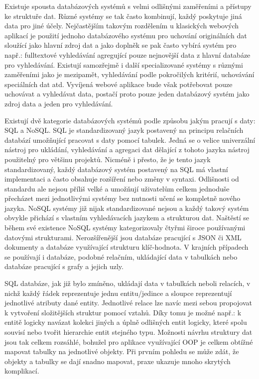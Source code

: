	Existuje spousta databázových systémů s velmi odlišnými zaměřeními a přístupy ke struktuře dat.
	Různé systémy se tak často kombinují, každý poskytuje jiná data pro jiné účely.
	Nejčastějším takovým rozdělením u klasických webových aplikací je použití jednoho databázového systému pro
	uchování originálních dat sloužící jako hlavní zdroj dat a jako doplněk se pak často vybírá
	systém pro např.: fulltextové vyhledávání agregující pouze nejnovější data z hlavní databáze pro vyhledávání.
	Existují samozřejmě i další specializované systémy s různými zaměřeními jako je mezipamět, vyhledávání podle pokročilých kritérií,
	uchovávání speciálních dat atd.
	Vyvíjená webové aplikace bude však potřebovat pouze uchovávat a vyhledávat data, postačí proto pouze jeden databázový systém
	jako zdroj data a jeden pro vyhledávání.

	Existují dvě kategorie databázových systémů podle způsobu jakým pracují s daty: \Ac{SQL} a \Ac{NoSQL}.
	\Ac{SQL} je standardizovaný jazyk postavený na principu relačních databází umožňující pracovat s daty pomocí tabulek.
	Jedná se o velice univerzální nástroj pro ukládání, vyhledávání a agregaci dat dělající z tohoto jazyka
	nástroj použitelný pro většinu projektů.
	Nicméně i přesto, že je tento jazyk standardizovaný, každý databázový systém postavený na \Ac{SQL}
	má vlastní implementaci a často obsahuje rozšíření nebo změny v syntaxi. \cite{sql_intro}
	Odlišnosti od standardu ale nejsou příliš velké a umožňují uživatelům celkem jednoduše přecházet mezi jednotlivými
	systémy bez nutnosti učení se kompletně nového jazyka.
	\Ac{NoSQL} systémy již nijak standardizované nejsou a každý takový systém obvykle přichází s vlastním
	vyhledávacích jazykem a strukturou dat.
	Naštěstí se během své existence \Ac{NoSQL} systémy kategorizovaly čtyřmi široce používanými
	datovými strukturami.
	Nerozšířenější jsou databáze pracující s \Ac{JSON} či \Ac{XML} dokumenty a databáze využívající strukturu klíč-hodnota.
	V krajních případech se používají i databáze, podobné relačním, ukládající data v tabulkách nebo databáze pracující
	s grafy a jejich uzly. \cite{nosql_explained}

	\Ac{SQL} databáze, jak již bylo zmíněno, ukládají data v tabulkách neboli relacích, v nichž každý řádek reprezentuje
	jednu entitu/jedince a sloupce reprezentují jednotlivé atributy dané entity.
	Jednotlivé relace lze navíc mezi sebou propojovat k vytvoření složitějších struktur pomocí vztahů.
	Díky tomu je možné např.: k entitě logicky navázat kolekci jiných a úplně odlišných entit logicky, které spolu souvisí
	nebo tvořit hierarchie entit stejného typu.
	Možnosti návrhu struktury dat jsou tak celkem rozsáhlé, bohužel pro aplikace využívající \Ac{OOP}
	je celkem obtížné mapovat tabulky na jednotlivé objekty.
	Při prvním pohledu se může zdát, že objekty a tabulky se dají snadno mapovat, praxe ukazuje mnoho skrytých komplikací.

